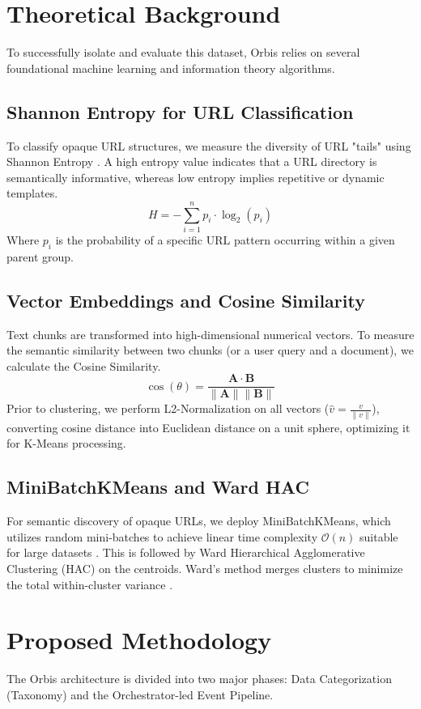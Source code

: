 \documentclass[a4paper,12pt]{article}
\begin{document}
\section{Theoretical Background}
To successfully isolate and evaluate this dataset, Orbis relies on several foundational machine learning and information theory algorithms. 

\subsection{Shannon Entropy for URL Classification}
To classify opaque URL structures, we measure the diversity of URL "tails" using Shannon Entropy \cite{shannon1948mathematical}. A high entropy value indicates that a URL directory is semantically informative, whereas low entropy implies repetitive or dynamic templates.
$$H = -\sum_{i=1}^{n} p_i \cdot \log_2(p_i)$$
Where $p_i$ is the probability of a specific URL pattern occurring within a given parent group.

\subsection{Vector Embeddings and Cosine Similarity}
Text chunks are transformed into high-dimensional numerical vectors. To measure the semantic similarity between two chunks (or a user query and a document), we calculate the Cosine Similarity.
$$\cos(\theta) = \frac{\mathbf{A} \cdot \mathbf{B}}{\|\mathbf{A}\| \|\mathbf{B}\|}$$
Prior to clustering, we perform L2-Normalization on all vectors ($\hat{v} = \frac{v}{\|v\|}$), converting cosine distance into Euclidean distance on a unit sphere, optimizing it for K-Means processing.

\subsection{MiniBatchKMeans and Ward HAC}
For semantic discovery of opaque URLs, we deploy MiniBatchKMeans, which utilizes random mini-batches to achieve linear time complexity $\mathcal{O}(n)$ suitable for large datasets \cite{sculley2010web}. This is followed by Ward Hierarchical Agglomerative Clustering (HAC) on the centroids. Ward's method merges clusters to minimize the total within-cluster variance \cite{ward1963hierarchical}.

\section{Proposed Methodology}
The Orbis architecture is divided into two major phases: Data Categorization (Taxonomy) and the Orchestrator-led Event Pipeline.
\end{document}
